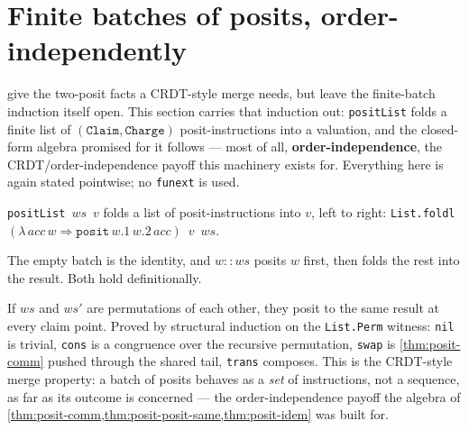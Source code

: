 \section{Finite batches of posits, order-independently}

 give the two-posit facts a
CRDT-style merge needs, but leave the finite-batch induction itself open.
This section carries that induction out: \texttt{positList} folds a finite
list of \((\mathtt{Claim}, \mathtt{Charge})\) posit-instructions into a
valuation, and the closed-form algebra promised for it follows --- most of
all, \textbf{order-independence}, the CRDT/order-independence payoff this
machinery exists for. Everything here is again stated pointwise; no
\texttt{funext} is used.

\begin{definition}\label{thm:positlist}\leanok{}
\texttt{positList}~\(ws\)~\(v\) folds a list of posit-instructions into \(v\),
left to right: \texttt{List.foldl}~\((\lambda\,acc\,w \Rightarrow
\texttt{posit}\,w.1\,w.2\,acc)\)~\(v\)~\(ws\).
\end{definition}

\begin{proposition}\label{thm:positlist-computation}\leanok{}
The empty batch is the identity, and \(w :: ws\) posits \(w\) first, then
folds the rest into the result. Both hold definitionally.
\end{proposition}

\begin{theorem}\label{thm:positlist-perm}\leanok{}
If \(ws\) and \(ws'\) are permutations of each other, they posit to the same
result at every claim point. Proved by structural induction on the
\texttt{List.Perm} witness: \texttt{nil} is trivial, \texttt{cons} is a
congruence over the recursive permutation, \texttt{swap} is
\cref{thm:posit-comm} pushed through the shared tail, \texttt{trans}
composes. This is the CRDT-style merge property: a batch of posits behaves
as a \emph{set} of instructions, not a sequence, as far as its outcome is
concerned --- the order-independence payoff the algebra of
\cref{thm:posit-comm,thm:posit-posit-same,thm:posit-idem} was built for.
\end{theorem}

